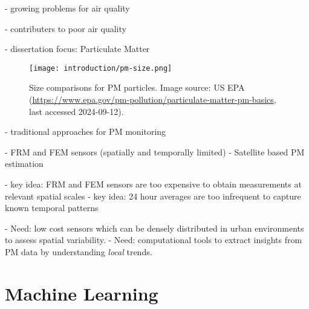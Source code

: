 - growing problems for air quality

- contributers to poor air quality

- dissertation focus: Particulate Matter

\begin{figure}[h!]
  \centering
  \texttt{[image: introduction/pm-size.png]}
  \caption{Size comparisons for PM particles. Image source: US EPA
    (\url{https://www.epa.gov/pm-pollution/particulate-matter-pm-basics}, last
    accessed 2024-09-12).}
  \label{fig:pm-size-scale}
\end{figure}


- traditional approaches for PM monitoring

- FRM and FEM sensors (spatially and temporally limited)
- Satellite based PM estimation



- key idea: FRM and FEM sensors are too expensive to obtain measurements at
relevant spatial scales
- key idea: 24 hour averages are too infrequent to capture known temporal
patterns

- Need: low cost sensors which can be densely distributed in urban environments
to assess spatial variability.
- Need: computational tools to extract insights from PM data by understanding
\textit{local} trends.





\section{Machine Learning}

